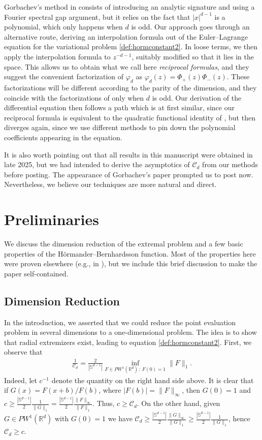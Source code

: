 \documentclass[a4paper,reqno,12pt]{amsart}
\newcommand{\C}{\mathscr{C}}
\renewcommand{\P}{\Phi}
\renewcommand{\r}{\mathbb{R}}
\newcommand{\p}{\varphi}
\renewcommand{\sp}{\mathbb{S}}
\begin{document}
Gorbachev's method in \cite{Gor2} consists of introducing an analytic signature and using a Fourier spectral gap argument, but it relies on the fact that $|x|^{d-1}$ is a polynomial, which only happens when $d$ is odd. Our approach goes through an alternative route, deriving an interpolation formula out of the Euler--Lagrange equation for the variational problem \eqref{def:hormconstant2}. In loose terms, we then apply the interpolation formula to $z^{-d -1}$, suitably modified so that it lies in the space. This allows us to obtain what we call here \textit{reciprocal formulas}, and they suggest the convenient factorization of $\p_d$ as $\p_d (z) = \P_+ (z) \P_-(z)$. These factorizations will be different according to the parity of the dimension, and they coincide with the factorizations of \cite{BORS2,DGT} only when $d$ is odd. Our derivation of the differential equation then follows a path which is at first similar, since our reciprocal formula is equivalent to the quadratic functional identity of \cite[Theorem 1(a)]{Gor2}, but then diverges again, since we use different methods to pin down the polynomial coefficients appearing in the equation. 

It is also worth pointing out that all results in this manuscript were obtained in late 2025, but we had intended to derive the asymptotics of $\C_d$ from our methods before posting. The appearance of Gorbachev's paper \cite{Gor2} prompted us to post now. Nevertheless, we believe our techniques are more natural and direct.

\section{Preliminaries}\label{sec:dim-reduction}

We discuss the dimension reduction of the extremal problem and a few basic properties of the H\"ormander--Bernhardsson function. Most of the properties here were proven elsewhere (e.g., in \cite{BCOS,DGT,Gor2,LL}), but we include this brief discussion to make the paper self-contained.

\subsection{Dimension Reduction}
In the introduction, we asserted that we could reduce the point evaluation problem in several dimensions to a one-dimensional problem. The idea is to show that radial extremizers exist, leading to equation \eqref{def:hormconstant2}. 
First, we observe that
\begin{align}\label{def:hormconstant}
    \frac{1}{\C_d}= \frac2{|\sp^{d-1}|} \inf_{F\in PW^1(\r^d) \, : \,  F(0)=1} \|F\|_{1}.
\end{align}
Indeed, let $c^{-1}$ denote the quantity on the right hand side above. It is clear that if $G(x)=F(x+b)/F(b)$, where $|F(b)|=\|F\|_\infty$, then
$G(0)=1$ and $c\geq \frac{|\sp^{d-1}|}{2}  \frac1{\|G\|_1} = \frac{|\sp^{d-1}|}{2} \frac{\|F\|_{\infty}}{\|F\|_{1}}$. Thus, $c\geq \C_d$. On the other hand, given $G\in PW^1(\r^d)$
with $G(0)=1$ we have $\C_d \geq \frac{|\sp^{d-1}|}{2} \frac{\|G\|_{\infty}}{\|G\|_{1}} \geq \frac{|\sp^{d-1}|}{2} \frac{1}{\|G\|_{1}}$, hence $\C_d\geq c$.
\end{document}

